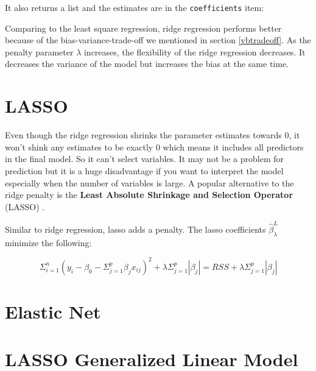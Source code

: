 \documentclass[12pt,]{krantz}
\makeatletter
\newenvironment{Shaded}{\begin{snugshade}}{\end{snugshade}}
\newcommand{\CommentTok}[1]{\textcolor[rgb]{0.37,0.37,0.37}{\textit{#1}}}
\newcommand{\NormalTok}[1]{#1}
\newcommand{\OperatorTok}[1]{\textcolor[rgb]{0.43,0.43,0.43}{\textbf{#1}}}
\newenvironment{kframe}{%
\medskip{}
\setlength{\fboxsep}{.8em}
 \def\at@end@of@kframe{}%
 \ifinner\ifhmode%
  \def\at@end@of@kframe{\end{minipage}}%
  \begin{minipage}{\columnwidth}%
 \fi\fi%
 \def\FrameCommand##1{\hskip\@totalleftmargin \hskip-\fboxsep
 \colorbox{shadecolor}{##1}\hskip-\fboxsep
     \hskip-\linewidth \hskip-\@totalleftmargin \hskip\columnwidth}%
 \MakeFramed {\advance\hsize-\width
   \@totalleftmargin\z@ \linewidth\hsize
   \@setminipage}}%
 {\par\unskip\endMakeFramed%
 \at@end@of@kframe}
\renewenvironment{Shaded}{\begin{kframe}}{\end{kframe}}
\makeatother
\begin{document}
It also returns a list and the estimates are in the \texttt{coefficients} item:

\begin{Shaded}
\end{Shaded}

Comparing to the least square regression, ridge regression performs better because of the bias-variance-trade-off we mentioned in section \ref{vbtradeoff}. As the penalty parameter \(\lambda\) increases, the flexibility of the ridge regression decreases. It decreases the variance of the model but increases the bias at the same time.

\hypertarget{lasso}{%
\section{LASSO}\label{lasso}}

Even though the ridge regression shrinks the parameter estimates towards 0, it won't shink any estimates to be exactly 0 which means it includes all predictors in the final model. So it can't select variables. It may not be a problem for prediction but it is a huge disadvantage if you want to interpret the model especially when the number of variables is large. A popular alternative to the ridge penalty is the \textbf{Least Absolute Shrinkage and Selection Operator} (LASSO) \citep{Tibshirani1996}.

Similar to ridge regression, lasso adds a penalty. The lasso coefficients \(\hat{\beta}_{\lambda}^{L}\) minimize the following:

\begin{equation}
\Sigma_{i=1}^{n}(y_{i}-\beta_{0}-\Sigma_{j=1}^{p}\beta_{j}x_{ij})^{2}+\lambda\Sigma_{j=1}^{p}|\beta_{j}|=RSS+\lambda\Sigma_{j=1}^{p}|\beta_{j}|
\label{eq:lasso}
\end{equation}

\hypertarget{elastic-net}{%
\section{Elastic Net}\label{elastic-net}}

\hypertarget{lasso-generalized-linear-model}{%
\section{LASSO Generalized Linear Model}\label{lasso-generalized-linear-model}}
\end{document}
